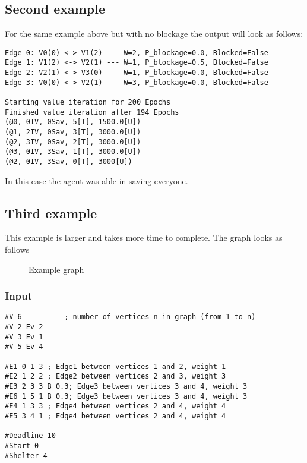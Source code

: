 \documentclass{article}                     %
\begin{document}
\subsection{Second example}
For the same example above but with no blockage the output will look as follows:
\begin{verbatim}
Edge 0: V0(0) <-> V1(2) --- W=2, P_blockage=0.0, Blocked=False
Edge 1: V1(2) <-> V2(1) --- W=1, P_blockage=0.5, Blocked=False
Edge 2: V2(1) <-> V3(0) --- W=1, P_blockage=0.0, Blocked=False
Edge 3: V0(0) <-> V2(1) --- W=3, P_blockage=0.0, Blocked=False

Starting value iteration for 200 Epochs
Finished value iteration after 194 Epochs
(@0, 0IV, 0Sav, 5[T], 1500.0[U])
(@1, 2IV, 0Sav, 3[T], 3000.0[U])
(@2, 3IV, 0Sav, 2[T], 3000.0[U])
(@3, 0IV, 3Sav, 1[T], 3000.0[U])
(@2, 0IV, 3Sav, 0[T], 3000[U])
\end{verbatim}
In this case the agent was able in saving everyone.

\subsection{Third example}
This example is larger and takes more time to complete. The graph looks as follows
\begin{figure}
	\centering
	\caption{Example graph}
\end{figure}

\subsubsection{Input}
\begin{verbatim}
#V 6          ; number of vertices n in graph (from 1 to n)
#V 2 Ev 2
#V 3 Ev 1
#V 5 Ev 4

#E1 0 1 3 ; Edge1 between vertices 1 and 2, weight 1
#E2 1 2 2 ; Edge2 between vertices 2 and 3, weight 3
#E3 2 3 3 B 0.3; Edge3 between vertices 3 and 4, weight 3
#E6 1 5 1 B 0.3; Edge3 between vertices 3 and 4, weight 3
#E4 1 3 3 ; Edge4 between vertices 2 and 4, weight 4
#E5 3 4 1 ; Edge4 between vertices 2 and 4, weight 4

#Deadline 10
#Start 0
#Shelter 4
\end{verbatim}
\end{document}
